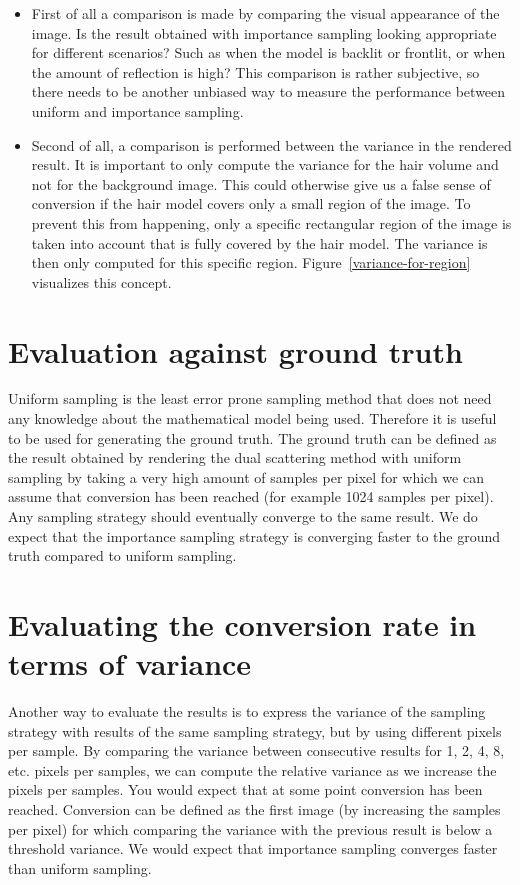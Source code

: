 \documentclass[11pt,a4paper]{report}
\begin{document}
\begin{itemize}

\item First of all a comparison is made by comparing the visual appearance of the image. Is the result obtained with importance sampling looking appropriate for different scenarios? Such as when the model is backlit or frontlit, or when the amount of reflection is high? This comparison is rather subjective, so there needs to be another unbiased way to measure the performance between uniform and importance sampling.

\item Second of all, a comparison is performed between the variance in the rendered result. It is important to only compute the variance for the hair volume and not for the background image. This could otherwise give us a false sense of conversion if the hair model covers only a small region of the image. To prevent this from happening, only a specific rectangular region of the image is taken into account that is fully covered by the hair model. The variance is then only computed for this specific region. Figure~\ref{variance-for-region} visualizes this concept.

\end{itemize}

\section{Evaluation against ground truth}

Uniform sampling is the least error prone sampling method that does not need any knowledge about the mathematical model being used. Therefore it is useful to be used for generating the ground truth. The ground truth can be defined as the result obtained by rendering the dual scattering method with uniform sampling by taking a very high amount of samples per pixel for which we can assume that conversion has been reached (for example 1024 samples per pixel).  Any sampling strategy should eventually converge to the same result. We do expect that the importance sampling strategy is converging faster to the ground truth compared to uniform sampling.


\section{Evaluating the conversion rate in terms of variance}

Another way to evaluate the results is to express the variance of the sampling strategy with results of the same sampling strategy, but by using different pixels per sample. By comparing the variance between consecutive results for 1, 2, 4, 8, etc. pixels per samples, we can compute the relative variance as we increase the pixels per samples. You would expect that at some point conversion has been reached. Conversion can be defined as the first image (by increasing the samples per pixel) for which comparing the variance with the previous result is below a threshold variance. We would expect that importance sampling converges faster than uniform sampling.
\end{document}
